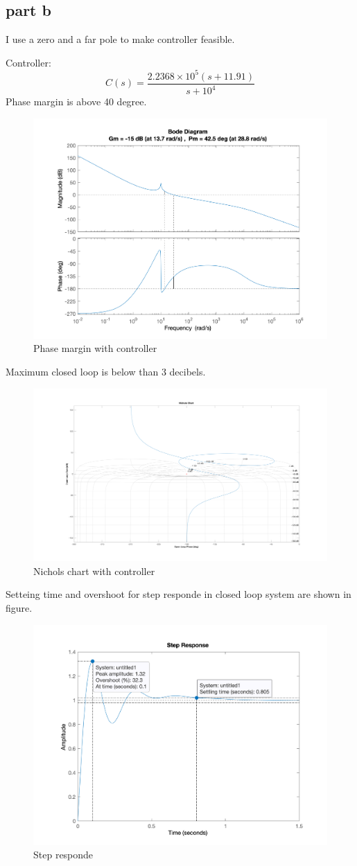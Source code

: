 \subsection{part b}
I use a zero and a far pole to make controller feasible.

Controller:
$$
C(s) = \dfrac{2.2368\times10^5(s+11.91)}{s+10^4}
$$
Phase margin is above 40 degree.
\begin{figure}[H]
    \caption{Phase margin with controller}
    \centering
    \includegraphics[width=12cm]{../Figure/Q1/Q1_b/margin.png}
\end{figure}
Maximum closed loop is below than 3 decibels.
\begin{figure}[H]
    \caption{Nichols chart with controller}
    \centering
    \includegraphics[width=16cm]{../Figure/Q1/Q1_b/nichols.png}
\end{figure}
Setteing time and overshoot for step responde in closed loop system are shown in figure.
\begin{figure}[H]
    \caption{Step responde}
    \centering
    \includegraphics[width=12cm]{../Figure/Q1/Q1_b/step.png}
\end{figure}
